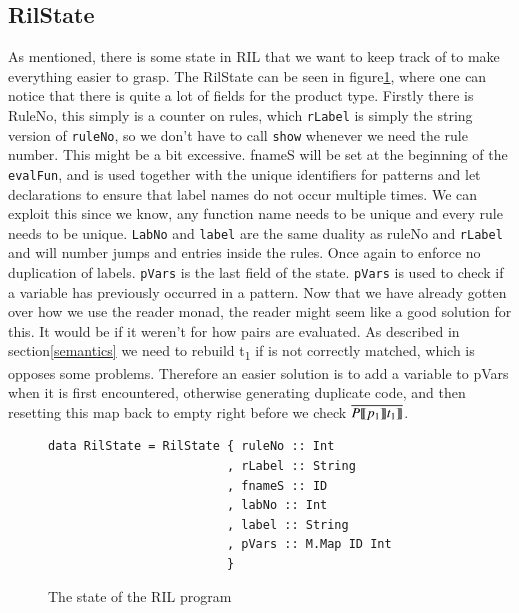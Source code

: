 \documentclass[a4paper]{article}
\begin{document}
\subsection{RilState}
\label{sec:org6ecb169}
As mentioned, there is some state in RIL that we want to keep track of to make everything easier to grasp. The RilState can be seen in figure\ref{state}, where one can notice that there is quite a lot of fields for the product type. Firstly there is RuleNo, this simply is a counter on rules, which \texttt{rLabel} is simply the string version of \texttt{ruleNo}, so we don't have to call \texttt{show} whenever we need the rule number. This might be a bit excessive. fnameS will be set at the beginning of the \texttt{evalFun}, and is used together with the unique identifiers for patterns and let declarations to ensure that label names do not occur multiple times. We can exploit this since we know, any function name needs to be unique and every rule needs to be unique. \texttt{LabNo} and \texttt{label} are the same duality as ruleNo and \texttt{rLabel} and will number jumps and entries inside the rules. Once again to enforce no duplication of labels. \texttt{pVars} is the last field of the state. \texttt{pVars} is used to check if a variable has previously occurred in a pattern. Now that we have already gotten over how we use the reader monad, the reader might seem like a good solution for this. It would be if it weren't for how pairs are evaluated. As described in section\ref{semantics} we need to rebuild t\textsubscript{1} if is not correctly matched, which is opposes some problems. Therefore an easier solution is to add a variable to pVars when it is first encountered, otherwise generating duplicate code, and then resetting this map back to empty right before we check \(\overline{P \llbracket p_1\rrbracket t_1\rrbracket}\).
\begin{figure}[!htb]
\begin{lstlisting}
data RilState = RilState { ruleNo :: Int
                         , rLabel :: String
                         , fnameS :: ID
                         , labNo :: Int
                         , label :: String
                         , pVars :: M.Map ID Int
                         }
\end{lstlisting}
\caption{The state of the RIL program}
\label{state}
\end{figure}
\end{document}
